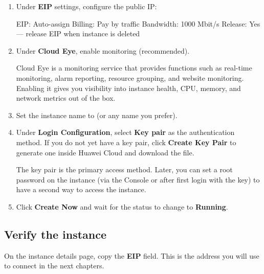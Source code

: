 \documentclass{guide}
\begin{document}
\begin{enumerate}
  \item Under \textbf{EIP} settings, configure the public IP:

  \begin{code}
EIP:            Auto-assign
Billing:        Pay by traffic
Bandwidth:      1000 Mbit/s
Release:        Yes — release EIP when instance is deleted
  \end{code}

  \item Under \textbf{Cloud Eye}, enable monitoring (recommended).

  \begin{infobox}
  Cloud Eye is a monitoring service that provides functions such as real-time
  monitoring, alarm reporting, resource grouping, and website monitoring.
  Enabling it gives you visibility into instance health, CPU, memory, and
  network metrics out of the box.
  \end{infobox}

  \item Set the instance name to 
        (or any name you prefer).

  \item Under \textbf{Login Configuration}, select \textbf{Key pair} as the
        authentication method. If you do not yet have a key pair, click
        \textbf{Create Key Pair} to generate one inside Huawei Cloud and
        download the  file.

  \begin{infobox}
  The key pair is the primary access method. Later, you can set a root
  password on the instance (via the Console or after first login with the key)
  to have a second way to access the instance.
  \end{infobox}

  \item Click \textbf{Create Now} and wait for the status to change to
        \textbf{Running}.
\end{enumerate}

\subsection{Verify the instance}

On the instance details page, copy the \textbf{EIP} field. This is the address you
will use to connect in the next chapters.
\end{document}
